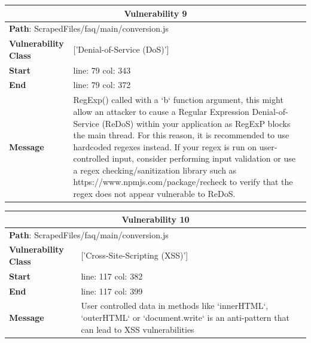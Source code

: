 \documentclass[12pt]{article}
\begin{document}
\vspace{0.7cm}
\FloatBarrier
\begin{table}[!h]
\centering
\renewcommand{\arraystretch}{1.3}
\begin{tabular}{|l|p{10cm}|}
\hline
\multicolumn{2}{|c|}{\textbf{Vulnerability 9}} \\
\hline
\multicolumn{2}{|l|}{\textbf{Path}: ScrapedFiles/faq/main/conversion.js} \\
\hline
\textbf{Vulnerability Class} & ['Denial-of-Service (DoS)'] \\
\hline
\textbf{Start} & line: 79 \quad col: 343 \\
\hline
\textbf{End} & line: 79 \quad col: 372 \\
\hline
\textbf{Message} & RegExp() called with a `b` function argument, this might allow an attacker to cause a Regular Expression Denial-of-Service (ReDoS) within your application as RegExP blocks the main thread. For this reason, it is recommended to use hardcoded regexes instead. If your regex is run on user-controlled input, consider performing input validation or use a regex checking/sanitization library such as https://www.npmjs.com/package/recheck to verify that the regex does not appear vulnerable to ReDoS. \\
\hline
\end{tabular}
\end{table}
\vspace{0.7cm}
\FloatBarrier
\begin{table}[!h]
\centering
\renewcommand{\arraystretch}{1.3}
\begin{tabular}{|l|p{10cm}|}
\hline
\multicolumn{2}{|c|}{\textbf{Vulnerability 10}} \\
\hline
\multicolumn{2}{|l|}{\textbf{Path}: ScrapedFiles/faq/main/conversion.js} \\
\hline
\textbf{Vulnerability Class} & ['Cross-Site-Scripting (XSS)'] \\
\hline
\textbf{Start} & line: 117 \quad col: 382 \\
\hline
\textbf{End} & line: 117 \quad col: 399 \\
\hline
\textbf{Message} & User controlled data in methods like `innerHTML`, `outerHTML` or `document.write` is an anti-pattern that can lead to XSS vulnerabilities \\
\hline
\end{tabular}
\end{table}
\vspace{0.7cm}
\FloatBarrier
\end{document}
